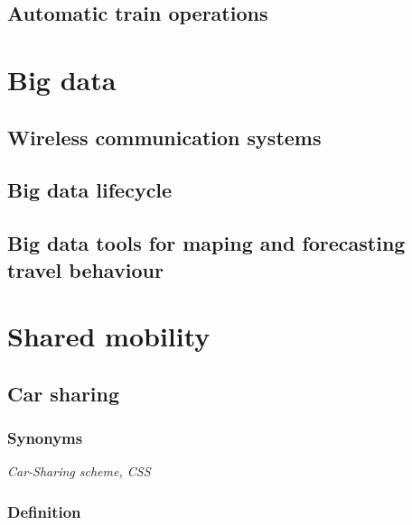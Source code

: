 \documentclass[
]{book}
\begin{document}
\hypertarget{automatic_train}{%
\section{Automatic train operations}\label{automatic_train}}

\hypertarget{big}{%
\chapter{Big data}\label{big}}

\hypertarget{wireless_com}{%
\section{Wireless communication systems}\label{wireless_com}}

\hypertarget{bd_life}{%
\section{Big data lifecycle}\label{bd_life}}

\hypertarget{bd_tool_maping}{%
\section{Big data tools for maping and forecasting travel behaviour}\label{bd_tool_maping}}

\hypertarget{shared}{%
\chapter{Shared mobility}\label{shared}}

\hypertarget{car_sharing}{%
\section{Car sharing}\label{car_sharing}}

\hypertarget{synonyms-27}{%
\subsection*{Synonyms}\label{synonyms-27}}

\emph{Car-Sharing scheme, CSS}

\hypertarget{definition-31}{%
\subsection*{Definition}\label{definition-31}}
\end{document}
